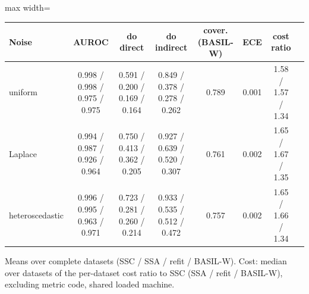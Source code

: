 \begin{adjustbox}{max width=\textwidth}
\begin{tabular}{lccccccc}
\toprule
Noise & AUROC & do direct & do indirect & cover. (BASIL-W) & ECE & cost ratio \\
\midrule
uniform & 0.998 / 0.998 / 0.975 / 0.975 & 0.591 / 0.200 / 0.169 / 0.164 & 0.849 / 0.378 / 0.278 / 0.262 & 0.789 & 0.001 & 1.58 / 1.57 / 1.34 \\
Laplace & 0.994 / 0.987 / 0.926 / 0.964 & 0.750 / 0.413 / 0.362 / 0.205 & 0.927 / 0.639 / 0.520 / 0.307 & 0.761 & 0.002 & 1.65 / 1.67 / 1.35 \\
heteroscedastic & 0.996 / 0.995 / 0.963 / 0.971 & 0.723 / 0.281 / 0.260 / 0.214 & 0.933 / 0.535 / 0.512 / 0.472 & 0.757 & 0.002 & 1.65 / 1.66 / 1.34 \\
\bottomrule
\end{tabular}
\end{adjustbox}

\smallskip
{\footnotesize Means over complete datasets (SSC / SSA / refit / BASIL-W). Cost: median over datasets of the per-dataset cost ratio to SSC (SSA / refit / BASIL-W), excluding metric code, shared loaded machine.}
